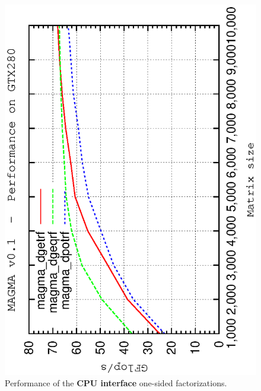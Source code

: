 \documentclass[10pt]{book}
\begin{document}
       \begin{figure}[!ht]
          \centering
          \hspace{-5mm}
          \includegraphics[angle=-90,scale=0.7]{dp-cpu.ps}
          \caption{Performance of the {\bf CPU interface} 
                   one-sided factorizations.}
       \label{dp-cpu-performance}
       \end{figure}
\end{document}
